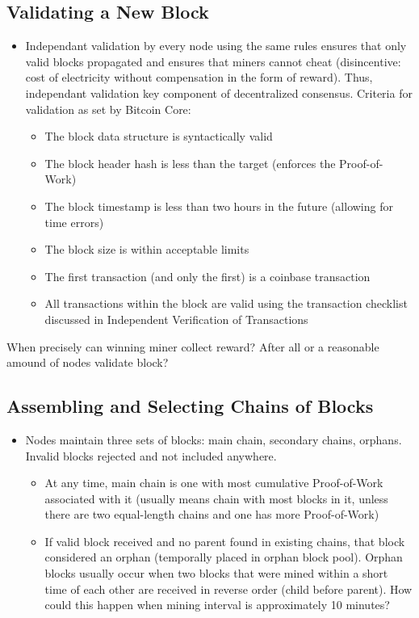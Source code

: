 \documentclass[english, 11pt]{article}
\begin{document}
\subsection{Validating a New Block}
\begin{itemize}
    \item Independant validation by every node using the same rules ensures that only valid blocks propagated and ensures that miners cannot cheat (disincentive: cost of electricity without compensation in the form of reward). Thus, independant validation key component of decentralized consensus. Criteria for validation as set by Bitcoin Core:
    \begin{itemize}
        \item The block data structure is syntactically valid
        \item The block header hash is less than the target (enforces the Proof-of-Work)
        \item The block timestamp is less than two hours in the future (allowing for time errors)
        \item The block size is within acceptable limits
        \item The first transaction (and only the first) is a coinbase transaction
        \item All transactions within the block are valid using the transaction checklist discussed in Independent Verification of Transactions
    \end{itemize}
\end{itemize}
\noindent When precisely can winning miner collect reward? After all or a reasonable amound of nodes validate block?

\subsection{Assembling and Selecting Chains of Blocks}
\begin{itemize}
    \item Nodes maintain three sets of blocks: main chain, secondary chains, orphans. Invalid blocks rejected and not included anywhere.
    \begin{itemize}
        \item At any time, main chain is one with most cumulative Proof-of-Work associated with it (usually means chain with most blocks in it, unless there are two equal-length chains and one has more Proof-of-Work)
        \item If valid block received and no parent found in existing chains, that block considered an orphan (temporally placed in orphan block pool). Orphan blocks usually occur when two blocks that were mined within a short time of each other are received in reverse order (child before parent). How could this happen when mining interval is approximately 10 minutes?
    \end{itemize}
\end{itemize}
\end{document}
